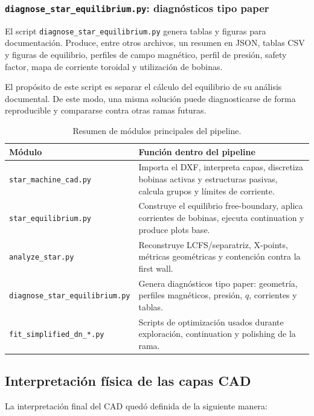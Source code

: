 \documentclass[11pt,a4paper]{article}
\begin{document}
\subsubsection{\texttt{diagnose\_star\_equilibrium.py}: diagnósticos tipo paper}
El script \texttt{diagnose\_star\_equilibrium.py} genera tablas y figuras para documentación.
Produce, entre otros archivos, un resumen en JSON, tablas CSV y figuras de equilibrio,
perfiles de campo magnético, perfil de presión, safety factor, mapa de corriente toroidal y
utilización de bobinas.

El propósito de este script es separar el cálculo del equilibrio de su análisis documental. De
este modo, una misma solución puede diagnosticarse de forma reproducible y compararse contra
otras ramas futuras.

\begin{table}[htbp]
\centering
\caption{Resumen de módulos principales del pipeline.}
\label{tab:pipeline_modules_detailed}
\begin{tabularx}{\textwidth}{p{}X}
\toprule
\textbf{Módulo} & \textbf{Función dentro del pipeline} \\
\midrule
\texttt{star\_machine\_cad.py} & Importa el DXF, interpreta capas, discretiza bobinas activas y estructuras pasivas, calcula grupos y límites de corriente. \\
\texttt{star\_equilibrium.py} & Construye el equilibrio free-boundary, aplica corrientes de bobinas, ejecuta continuation y produce plots base. \\
\texttt{analyze\_star.py} & Reconstruye LCFS/separatriz, X-points, métricas geométricas y contención contra la first wall. \\
\texttt{diagnose\_star\_equilibrium.py} & Genera diagnósticos tipo paper: geometría, perfiles magnéticos, presión, $q$, corrientes y tablas. \\
\texttt{fit\_simplified\_dn\_*.py} & Scripts de optimización usados durante exploración, continuation y polishing de la rama. \\
\bottomrule
\end{tabularx}
\end{table}

\subsection{Interpretación física de las capas CAD}
La interpretación final del CAD quedó definida de la siguiente manera:
\end{document}

